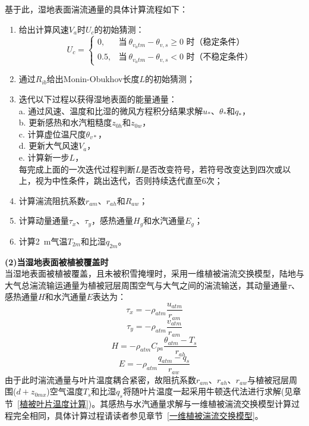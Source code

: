 基于此，湿地表面湍流通量的具体计算流程如下：
\begin{enumerate}
    \item 给出计算风速$V_a$时$U_c$的初始猜测：
        \begin{equation}
            U_c = \begin{cases}
                0, &\text{当}\ \theta_{v_atm}-\theta_{v,s} \geqslant 0 \text{ 时（稳定条件）} \\
                0.5, &\text{当}\ \theta_{v_atm}-\theta_{v,s} < 0 \text{ 时（不稳定条件）}
            \end{cases}
        \end{equation}
    \item 通过$R_{ib}$给出Monin-Obukhov长度$L$的初始猜测；
    \item 迭代以下过程以获得湿地表面的能量通量：\\
        a. 通过风速、温度和比湿的微风方程积分结果求解$u_*$、$\theta_*$和$q_*$，\\
        b. 更新感热和水汽粗糙度$z_{0h}$和$z_{0w}$，\\
        c. 计算虚位温尺度$\theta_{v*}$，\\
        d. 更新大气风速$V_a$，\\
        e. 计算新一步$L$，\\
        每完成上面的一次迭代过程判断$L$是否改变符号，若符号改变达到四次或以上，视为中性条件，跳出迭代，否则持续迭代直至6次；
    \item 计算湍流阻抗系数$r_{am}$、$r_{ah}$和$R_{aw}$；
    \item 计算动量通量$\tau_x$、$\tau_y$，感热通量$H_g$和水汽通量$E_g$；
    \item 计算\qty{2}{m}气温$T_{2m}$和比湿$q_{2m}$。
\end{enumerate}

\textbf {(2)当湿地表面被植被覆盖时}\\

当湿地表面被植被覆盖，且未被积雪掩埋时，采用一维植被湍流交换模型，陆地与大气总湍流输运通量为植被冠层周围空气与大气之间的湍流输送，其动量通量$\tau$、感热通量$H$和水汽通量$E$表达为：
\begin{equation}
\tau_{x}=-\rho_{atm} \frac{u_{atm}}{r_{a m}}
\end{equation}
\begin{equation}
\tau_{y}=-\rho_{atm} \frac{v_{atm}}{r_{a m}}
\end{equation}
\begin{equation}
H=-\rho_{atm} C_{p a} \frac{\theta_{atm}-T_{s}}{r_{a h}}
\end{equation}
\begin{equation}
E=-\rho_{atm} \frac{q_{atm}-q_{s}}{r_{a w}}
\end{equation}
由于此时湍流通量与叶片温度耦合紧密，故阻抗系数$r_{am}$、$r_{ah}$、$r_{aw}$与植被冠层周围($d+z_{0mx}$)空气温度$T_s$和比湿$q_s$将随叶片温度一起采用牛顿迭代法进行求解(见章节~\ref{植被叶片温度计算})。其感热与水汽通量求解与一维植被湍流交换模型计算过程完全相同，具体计算过程请读者参见章节~\ref{一维植被湍流交换模型}。

